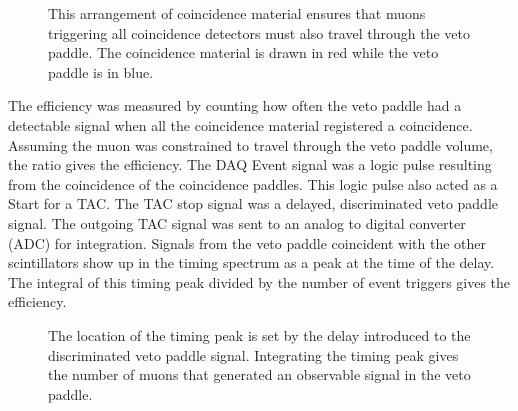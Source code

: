 \begin{figure}[htp]
\caption{This arrangement of coincidence material ensures that muons triggering all coincidence detectors must also travel through the veto paddle.  The coincidence material is drawn in red while the veto paddle is in blue.}
\label{fig:efficiencyTest}
\end{figure}

The efficiency was measured by counting how often the veto paddle had a detectable signal when all the coincidence material registered a coincidence.  Assuming the muon was constrained to travel through the veto paddle volume, the ratio gives the efficiency.  The DAQ Event signal was a logic pulse resulting from the coincidence of the coincidence paddles.  This logic pulse also acted as a Start for a TAC.  The TAC stop signal was a delayed, discriminated veto paddle signal.  The outgoing TAC signal was sent to an analog to digital converter (ADC) for integration.  Signals from the veto paddle coincident with the other scintillators show up in the timing spectrum as a peak at the time of the delay.  The integral of this timing peak divided by the number of event triggers gives the efficiency.
\begin{figure}[htp]
\centering
{}
\caption{The location of the timing peak is set by the delay introduced to the discriminated veto paddle signal.  Integrating the timing peak gives the number of muons that generated an observable signal in the veto paddle.}
\label{fig:vetoTestElectronics}
\end{figure}

